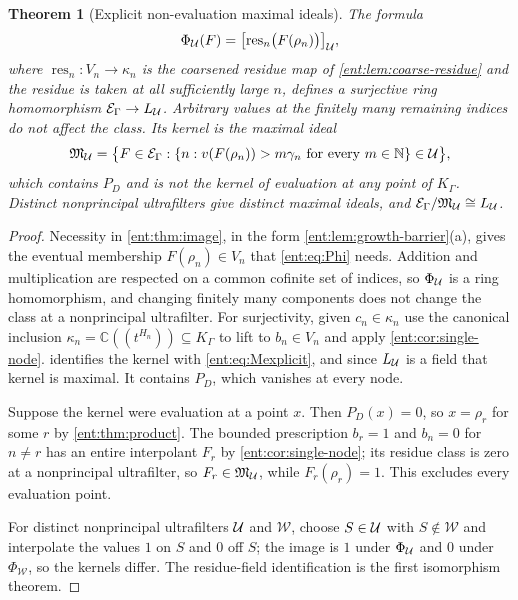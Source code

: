 \documentclass[11pt]{article}
\newtheorem{theorem}{Theorem}[section]
\theoremstyle{plain}
\theoremstyle{plain}
\theoremstyle{plain}
\theoremstyle{definition}
\theoremstyle{definition}
\theoremstyle{definition}
\theoremstyle{definition}
\theoremstyle{remark}
\newcommand{\C}{\mathbb C}\newcommand{\R}{\mathbb R}
\newcommand{\K}{K_\Gamma}\newcommand{\KD}{K_\Delta}
\newcommand{\E}{\mathcal E_\Gamma}
\newcommand{\res}{\operatorname{res}}
\begin{document}
\begin{theorem}[Explicit non-evaluation maximal ideals]\label{ent:thm:maximal}
The formula
\begin{equation}\label{ent:eq:Phi}
 \Phi_\Ucal(F)=\bigl[\res_n\bigl(F(\rho_n)\bigr)\bigr]_\Ucal ,
\end{equation}
where $\res_n:V_n\to\kappa_n$ is the coarsened residue map of
\cref{ent:lem:coarse-residue} and the residue is taken at all sufficiently
large $n$, defines a surjective ring homomorphism $\E\to L_\Ucal$. Arbitrary
values at the finitely many remaining indices do not affect the class. Its
kernel is the maximal ideal
\begin{equation}\label{ent:eq:Mexplicit}
 \mathfrak M_\Ucal=
 \bigl\{F\in\E:\{n:v(F(\rho_n))>m\gamma_n\text{ for every }m\in\N\}
 \in\Ucal\bigr\},
\end{equation}
which contains $P_D$ and is not the kernel of evaluation at any point of
$\K$. Distinct nonprincipal ultrafilters give distinct maximal ideals, and
$\E/\mathfrak M_\Ucal\cong L_\Ucal$.
\end{theorem}
\begin{proof}
Necessity in \cref{ent:thm:image}, in the form
\cref{ent:lem:growth-barrier}(a), gives the eventual membership
$F(\rho_n)\in V_n$ that \eqref{ent:eq:Phi} needs. Addition and multiplication
are respected on a common cofinite set of indices, so $\Phi_\mathcal U$ is a ring
homomorphism, and changing finitely many components does not change the class
at a nonprincipal ultrafilter. For surjectivity, given $c_n\in\kappa_n$ use
the canonical inclusion $\kappa_n=\C((t^{H_n}))\subseteq\K$ to lift to
$b_n\in V_n$ and apply \cref{ent:cor:single-node}.
 identifies the kernel with
\eqref{ent:eq:Mexplicit}, and since $L_\mathcal U$ is a field that kernel is
maximal. It contains $P_D$, which vanishes at every node.

Suppose the kernel were evaluation at a point $x$. Then $P_D(x)=0$, so
$x=\rho_r$ for some $r$ by \cref{ent:thm:product}. The bounded prescription
$b_r=1$ and $b_n=0$ for $n\ne r$ has an entire interpolant $F_r$ by
\cref{ent:cor:single-node}; its residue class is zero at a nonprincipal
ultrafilter, so $F_r\in\mathfrak M_\mathcal U$, while $F_r(\rho_r)=1$. This
excludes every evaluation point.

For distinct nonprincipal ultrafilters $\mathcal U$ and $\mathcal W$, choose
$S\in\mathcal U$ with $S\notin\mathcal W$ and interpolate the values $1$ on $S$
and $0$ off $S$; the image is $1$ under $\Phi_\mathcal U$ and $0$ under
$\Phi_\mathcal W$, so the kernels differ. The residue-field identification is
the first isomorphism theorem.
\end{proof}
\end{document}
